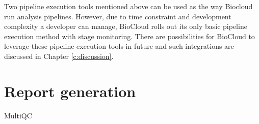 Two pipeline execution tools mentioned above can be used as the way Biocloud
run analysis pipelines. However, due to time constraint and development
complexity a developer can manage, BioCloud rolls out its only basic pipeline
execution method with stage monitoring. There are possibilities for BioCloud to
leverage these pipeline execution tools in future and such integrations are
discussed in Chapter \ref{c:discussion}.


\section{Report generation}

MultiQC \cite{ewels2016:multiqc}



